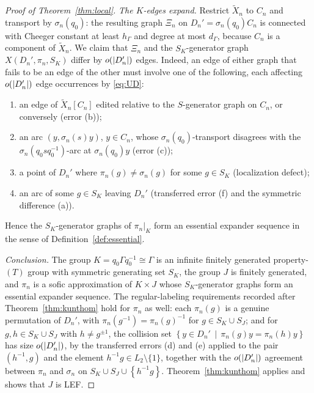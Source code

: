 \documentclass[11pt]{amsart}
\theoremstyle{definition}
\theoremstyle{plain}
\DeclarePairedDelimiter{\abs}{\lvert}{\rvert}
\newcommand{\set}[1]{\left\{#1\right\}}
\newcommand{\suchthat}{\,\middle|\,}
\begin{document}
\begin{proof}[Proof of Theorem~\ref{thm:local}]
\emph{The \(K\)-edges expand.}  Restrict \(\widetilde X_n\) to \(C_n\) and transport by \(\sigma_n(q_0)\): the resulting graph \(\Xi_n\) on \(D_n'=\sigma_n(q_0)C_n\) is connected with Cheeger constant at least \(h_\Gamma\) and degree at most \(d_\Gamma\), because \(C_n\) is a component of \(\widetilde X_n\).  We claim that \(\Xi_n\) and the \(S_K\)-generator graph \(X(D_n',\pi_n,S_K)\) differ by \(o(\abs{D_n'})\) edges.  Indeed, an edge of either graph that fails to be an edge of the other must involve one of the following, each affecting \(o(\abs{D_n'})\) edge occurrences by \eqref{eq:UD}:
\begin{enumerate}[label=\textup{(\arabic*)}]
\item an edge of \(\widetilde X_n[C_n]\) edited relative to the \(S\)-generator graph on \(C_n\), or conversely (error (b));
\item an arc \((y,\sigma_n(s)y)\), \(y\in C_n\), whose \(\sigma_n(q_0)\)-transport disagrees with the \(\sigma_n(q_0sq_0^{-1})\)-arc at \(\sigma_n(q_0)y\) (error (c));
\item a point of \(D_n'\) where \(\pi_n(g)\ne\sigma_n(g)\) for some \(g\in S_K\) (localization defect);
\item an arc of some \(g\in S_K\) leaving \(D_n'\) (transferred error (f) and the symmetric difference (a)).
\end{enumerate}
Hence the \(S_K\)-generator graphs of \(\pi_n|_K\) form an essential expander sequence in the sense of Definition~\ref{def:essential}.

\emph{Conclusion.}  The group \(K=q_0\Gamma q_0^{-1}\cong\Gamma\) is an infinite finitely generated property-\((T)\) group with symmetric generating set \(S_K\), the group \(J\) is finitely generated, and \(\pi_n\) is a sofic approximation of \(K\times J\) whose \(S_K\)-generator graphs form an essential expander sequence.  The regular-labeling requirements recorded after Theorem~\ref{thm:kunthom} hold for \(\pi_n\) as well: each \(\pi_n(g)\) is a genuine permutation of \(D_n'\), with \(\pi_n(g^{-1})=\pi_n(g)^{-1}\) for \(g\in S_K\cup S_J\); and for \(g,h\in S_K\cup S_J\) with \(h\ne g^{\pm1}\), the collision set \(\set{y\in D_n'\suchthat\pi_n(g)y=\pi_n(h)y}\) has size \(o(\abs{D_n'})\), by the transferred errors (d) and (e) applied to the pair \((h^{-1},g)\) and the element \(h^{-1}g\in L_2\setminus\{1\}\), together with the \(o(\abs{D_n'})\) agreement between \(\pi_n\) and \(\sigma_n\) on \(S_K\cup S_J\cup\set{h^{-1}g}\).  Theorem~\ref{thm:kunthom} applies and shows that \(J\) is LEF.
\end{proof}
\end{document}
